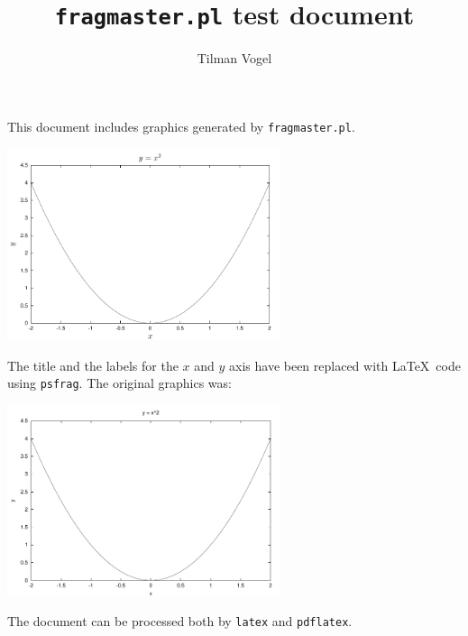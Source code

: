 \documentclass{article}
\begin{document}
\title{\texttt{fragmaster.pl} test document}
\author{Tilman Vogel}

\maketitle

This document includes graphics generated by \texttt{fragmaster.pl}.

\begin{center}
  \includegraphics[width=0.6\textwidth]{parabel}
\end{center}

The title and the labels for the $x$ and $y$ axis have been replaced
with \LaTeX\ code using \texttt{psfrag}. The original graphics was:

\begin{center}
  \includegraphics[width=0.6\textwidth]{parabel_fm}
\end{center}

The document can be processed both by \texttt{latex} and
\texttt{pdflatex}.
\end{document}
